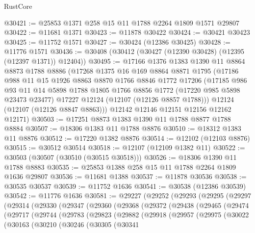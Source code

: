 \begin{lexlean}{RustCore}
\begin{coremodule}
@30421 := @25853 @1371 @258 @15 @11 @1788 @2264 @1809 @1571 @29807
@30422 := @11681 @1371
@30423 := @11878 @30422
@30424 := @30421 @30423
@30425 := @11752 @1571
@30427 := @30424 (@12386 @30425)
@30428 := @11776 @1571
@30436 := @30408 (@30412 (@30427 (@12390 @30428) (@12395 (@12397 @1371)) @12404))
@30495 := @17166
    @1376
    @1383
    @1390
    @11
    @8864
    @8873
    @1788
    @8886
    (@17268
      @1375
      @16
      @169
      @8864
      @8871
      @1795
      (@17186
        @988
        @11
        @15
        @1926
        @8863
        @8870
        @1766
        @8846
        @1772
        @17206
        (@17185
          @986
          @93
          @11
          @14
          @5898
          @1788
          @1805
          @1766
          @8856
          @1772
          (@17220 @985 @5898 @23473 @23477)
          @17227
          @12124
          (@12107 (@12126 @8857 @1788)))
        @12124
        (@12107 (@12126 @8847 @8863)))
      @12142
      @12146
      @12151
      @12156
      @12162
      @12171)
@30503 := @17251 @8873 @1383 @1390 @11 @1788 @8877 @1788 @8884
@30507 := @18306 @1383 @11 @1788 @8876
@30510 := @18312 @1383 @11 @8876
@30512 := @17220 @1382 @8876
@30514 := @12102 (@12103 @8876)
@30515 := @30512 @30514
@30518 := @12107 (@12109 @1382 @11)
@30522 := @30503 (@30507 (@30510 (@30515 @30518)))
@30526 := @18306 @1390 @11 @1788 @8883
@30535 := @25853 @1388 @258 @15 @11 @1788 @2264 @1809 @1636 @29807
@30536 := @11681 @1388
@30537 := @11878 @30536
@30538 := @30535 @30537
@30539 := @11752 @1636
@30541 := @30538 (@12386 @30539)
@30542 := @11776 @1636
@30581 := @29227
    (@29252
      (@29293
        (@29295
          (@29297
            (@29314
              (@29330
                (@29347
                  (@29360
                    (@29368
                      (@29372
                        (@29438
                          (@29465
                            (@29474
                              (@29717
                                (@29744
                                  (@29783
                                    (@29823
                                      (@29882
                                        (@29918
                                          (@29957
                                            (@29975
                                              (@30022
                                                (@30163
                                                  (@30210
                                                    (@30246
                                                      (@30305
                                                        (@30341

\end{coremodule}
\end{lexlean}
